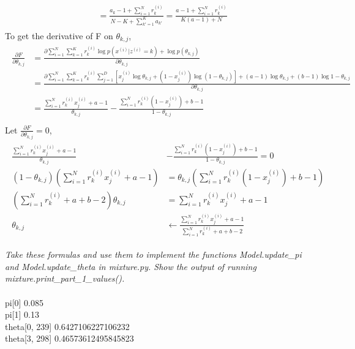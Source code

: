 \documentclass{myhw}
\begin{document}
\begin{homeworkProblem}
\begin{homeworkSection}
\begin{gather*}
\begin{aligned}
& =  \frac{ a_k - 1 + \sum_{i=1}^{N} r_k^{(i)} }{ N - K + \sum_{k'=1}^K a_{k'} } =\frac{a-1+\sum_{i=1}^{N} r_k^{(i)}}{K(a-1)+N}
\end{aligned}
\end{gather*}
To get the derivative of F on $\theta_{k,j}$,
\begin{gather*}
\begin{aligned}
\frac{\partial F}{\partial \theta_{k,j}} & = \frac{\partial \sum_{i=1}^{N}\sum_{k=1}^{K}r_k^{(i)} \log{p(x^{(i)}|z^{(i)}=k)} + \log{p(\theta_{k,j})} }{\partial \theta_{k,j}} \\
& = \frac{\partial \sum_{i=1}^{N}\sum_{k=1}^{K}r_k^{(i)} \sum_{j=1}^D [x_j^{(i)} \log{\theta_{k,j}} + (1-x_j^{(i)}) \log{(1-\theta_{k,j})}] + (a-1) \log{\theta_{k,j}} + (b-1) \log{1-\theta_{k,j}} }{\partial \theta_{k,j}} \\
& = \frac{ \sum_{i=1}^{N} r_k^{(i)} x_j^{(i)} + a - 1 }{\theta_{k,j}} - \frac{ \sum_{i=1}^{N} r_k^{(i)} (1 - x_j^{(i)}) + b - 1 }{1 - \theta_{k,j}} \\
\end{aligned}
\end{gather*}
Let $ \frac{\partial F}{\partial \theta_{k,j}} = 0$,
\begin{gather*}
\begin{aligned}
\frac{ \sum_{i=1}^{N} r_k^{(i)} x_j^{(i)} + a - 1 }{\theta_{k,j}} & - \frac{ \sum_{i=1}^{N} r_k^{(i)} (1 - x_j^{(i)}) + b - 1 }{1 - \theta_{k,j}} = 0 \\
(1 - \theta_{k,j}) (\sum_{i=1}^{N} r_k^{(i)} x_j^{(i)} + a - 1) & = \theta_{k,j} (\sum_{i=1}^{N} r_k^{(i)} (1 - x_j^{(i)}) + b - 1)
 \\
 (\sum_{i=1}^{N} r_k^{(i)} + a + b - 2) \theta_{k,j} & = \sum_{i=1}^{N} r_k^{(i)} x_j^{(i)} + a - 1 \\
 \theta_{k,j} & \leftarrow \frac{\sum_{i=1}^{N} r_k^{(i)} x_j^{(i)} + a - 1}{\sum_{i=1}^{N} r_k^{(i)} + a + b - 2}
\end{aligned}
\end{gather*}
\end{homeworkSection}
\begin{homeworkSection}	
\emph{Take these formulas and use them to implement the functions Model.update\_pi and Model.update\_theta in mixture.py. Show the output of running mixture.print\_part\_1\_values(). } \\
\\
pi[0] 0.085 \\
pi[1] 0.13 \\
theta[0, 239] 0.6427106227106232 \\
theta[3, 298] 0.46573612495845823
\end{homeworkSection}
\end{homeworkProblem}
\end{document}
